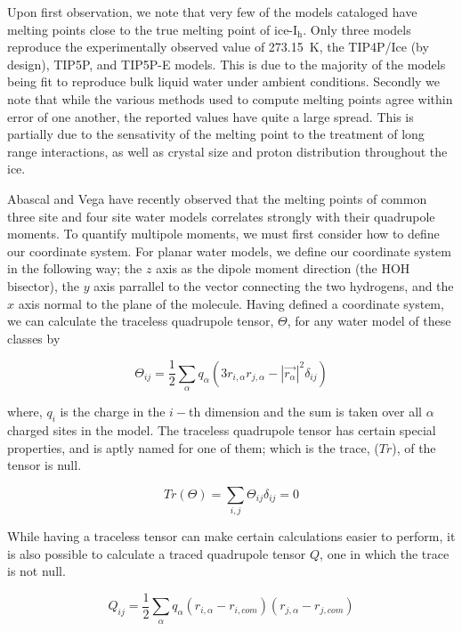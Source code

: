 Upon first observation, we note that very few of the models cataloged
have melting points close to the true melting point of
ice-I$_\mathrm{h}$.  Only three models reproduce the experimentally
observed value of 273.15~K, the TIP4P/Ice (by design), TIP5P, and
TIP5P-E models. This is due to the majority of the models being fit to
reproduce bulk liquid water under ambient conditions. Secondly we note
that while the various methods used to compute melting points agree
within error of one another, the reported values have quite a large
spread. This is partially due to the sensativity of the melting point
to the treatment of long range interactions\cite{Arbuckle2002,
  Bryk2004}, as well as crystal size\cite{Pan2011} and proton
distribution throughout the ice.\cite{Louden2017}

Abascal and Vega have recently observed that the melting points of
common three site and four site water models correlates strongly with
their quadrupole
moments.\cite{Abascal2007,Abascal2007a,Abascal2007b,Abascal2007c} To
quantify multipole moments, we must first consider how to define our
coordinate system. For planar water models, we define our coordinate
system in the following way; the $z$ axis as the dipole moment
direction (the HOH bisector), the $y$ axis parrallel to the vector
connecting the two hydrogens, and the $x$ axis normal to the plane of
the molecule. Having defined a coordinate system, we can calculate the
traceless quadrupole tensor, $\Theta$, for any water model of these
classes by

\begin{equation}
\Theta_{ij} = \frac{1}{2} \sum_{\alpha}q_{\alpha}(3r_{i,\alpha}r_{j,\alpha}-|\vec{r_{\alpha}}|^{2}\delta_{ij})
\end{equation}

where, $q_i$ is the charge in the $i-$th dimension and the sum is
taken over all $\alpha$ charged sites in the model. The traceless
quadrupole tensor has certain special properties, and is aptly named
for one of them; which is the trace, ($Tr$), of the tensor is null.

\begin{equation}
Tr(\Theta) = \sum_{i,j}\Theta_{ij}\delta_{ij} = 0
\end{equation}

While having a traceless tensor can make certain calculations easier to 
perform, it is also possible to calculate a traced quadrupole tensor $Q$, one
in which the trace is not null.

\begin{equation}
Q_{ij} = \frac{1}{2}\sum_{\alpha}q_{\alpha}(r_{i,\alpha}-r_{i,com})(r_{j,\alpha}-r_{j,com})
\end{equation}

